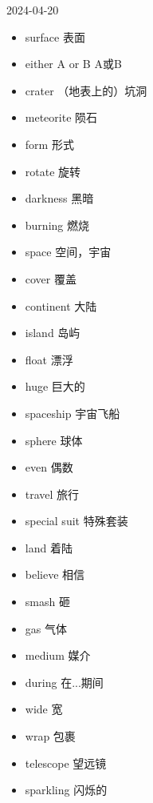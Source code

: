 \documentclass{article}
\begin{document}
2024-04-20
\begin{itemize}
\item surface 表面
\item either A or B A或B
\item crater （地表上的）坑洞
\item meteorite 陨石
\item form 形式
\item rotate 旋转
\item darkness 黑暗
\item burning 燃烧
\item space 空间，宇宙
\item cover 覆盖
\item continent 大陆
\item island 岛屿
\item float 漂浮
\item huge 巨大的
\item spaceship 宇宙飞船
\item sphere 球体
\item even 偶数
\item travel 旅行
\item special suit 特殊套装
\item land 着陆
\item believe 相信
\item smash 砸
\item gas 气体
\item medium 媒介
\item during 在...期间
\item wide 宽
\item wrap 包裹
\item telescope 望远镜
\item sparkling 闪烁的
\end{itemize} 
\end{document}
